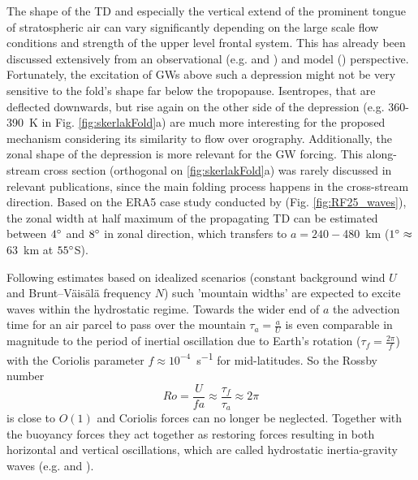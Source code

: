 The shape of the TD and especially the vertical extend of the prominent tongue of stratospheric air can vary significantly depending on the large scale flow conditions and strength of the upper level frontal system. This has already been discussed extensively from an observational (e.g. \cite{shapiro_further_1978} and \cite{keyser_review_1986}) and model (\cite{skerlak_tropopause_2015}) perspective. Fortunately, the excitation of GWs above such a depression might not be very sensitive to the fold's shape far below the tropopause. Isentropes, that are deflected downwards, but rise again on the other side of the depression (e.g. 360-\SI{390}{\kelvin} in Fig. \ref{fig:skerlakFold}a) are much more interesting for the proposed mechanism considering its similarity to flow over orography. Additionally, the zonal shape of the depression is more relevant for the GW forcing. This along-stream cross section (orthogonal on \ref{fig:skerlakFold}a) was rarely discussed in relevant publications, since the main folding process happens in the cross-stream direction. Based on the ERA5 case study conducted by \textcite{dornbrack_stratospheric_2021} (Fig. \ref{fig:RF25_waves}), the zonal width at half maximum of the propagating TD can be estimated between $4 \degree$ and $8 \degree$ in zonal direction, which transfers to $a=240-$\SI{480}{\kilo\meter}
($1\degree \approx$ \SI{63}{\kilo\meter} at $55 \degree$S). 

Following estimates based on idealized scenarios (constant background wind $U$ and Brunt–Väisälä frequency $N$) such 'mountain widths' are expected to excite waves within the hydrostatic regime. Towards the wider end of $a$ the advection time for an air parcel to pass over the mountain $\tau_a = \frac{a}{U}$ is even comparable in magnitude to the period of inertial oscillation due to Earth’s rotation ($\tau_f = \frac{2 \pi}{f}$) with the Coriolis parameter $f \approx 10^{-4}$\SI{}{\second^{-1}} for mid-latitudes. So the Rossby number
\begin{equation}
    Ro = \frac{U}{f a} \approx \frac{\tau_f}{\tau_a} \approx 2 \pi
\end{equation}
%
is close to $O(1)$ and Coriolis forces can no longer be neglected. Together with the buoyancy forces they act together as restoring forces resulting in both horizontal and vertical oscillations, which are called hydrostatic inertia-gravity waves (e.g. \cite{gill_atmosphere-ocean_1982} and \cite{lin_mesoscale_2007}).


